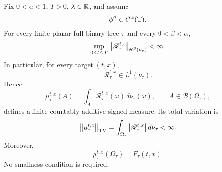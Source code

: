 \begin{theorem}
\label{thm:canonical-raw-measure}
Fix $0<\alpha<1$, $T>0$, $\lambda\in\mathbb R$, and assume
\begin{equation*}
  \phi''\in C^\alpha(\mathbb T).
\end{equation*}
For every finite planar full binary tree $\tau$ and every $0<\beta<\alpha$,
\begin{equation}
  \sup_{0\leq t\leq T}
  \left\lVert\mathscr R_\tau^{t,\cdot}\right\rVert_{\mathcal H^\beta(\nu_\tau)}
  <\infty.
  \label{eq:raw-fixed-tree-holder}
\end{equation}
In particular, for every target $(t,x)$,
\begin{equation*}
  \mathscr R_\tau^{t,x}\in L^1(\nu_\tau).
\end{equation*}
Hence
\begin{equation}
  \boxed{
  \mu_\tau^{t,x}(A)
  =
  \int_A\mathscr R_\tau^{t,x}(\omega)
  \,d\nu_\tau(\omega),
  \qquad A\in\mathcal B(\Omega_\tau),
  }
  \label{eq:canonical-raw-measure}
\end{equation}
defines a finite countably additive signed measure. Its total variation is
\begin{equation*}
  \left\lVert\mu_\tau^{t,x}\right\rVert_{\mathrm{TV}}
  =
  \int_{\Omega_\tau}
  \left|\mathscr R_\tau^{t,x}\right|d\nu_\tau
  <\infty.
\end{equation*}
Moreover,
\begin{equation}
  \boxed{
  \mu_\tau^{t,x}(\Omega_\tau)
  =
  F_\tau(t,x).
  }
  \label{eq:canonical-raw-mass}
\end{equation}
No smallness condition is required.
\end{theorem}

